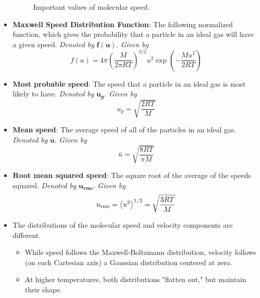 \documentclass[../notes.tex]{subfiles}
\begin{document}
\begin{itemize}
\begin{figure}[h!]
        \caption{Important values of molecular speed.}
        \label{fig:molecularSpeed}
    \end{figure}
    \item \textbf{Maxwell Speed Distribution Function}: The following normalized function, which gives the probability that a particle in an ideal gas will have a given speed. \emph{Denoted by} $\bm{f(u)}$. \emph{Given by}
    \begin{equation*}
        f(u) = 4\pi\left( \frac{M}{2\pi RT} \right)^{3/2}u^2\exp\left( -\frac{Mu^2}{2RT} \right)
    \end{equation*}
    \item \textbf{Most probable speed}: The speed that a particle in an ideal gas is most likely to have. \emph{Denoted by} $\bm{u_p}$. \emph{Given by}
    \begin{equation*}
        u_p = \sqrt{\frac{2RT}{M}}
    \end{equation*}
    \item \textbf{Mean speed}: The average speed of all of the particles in an ideal gas. \emph{Denoted by} $\bm{\bar{u}}$. \emph{Given by}
    \begin{equation*}
        \bar{u} = \sqrt{\frac{8RT}{\pi M}}
    \end{equation*}
    \item \textbf{Root mean squared speed}: The square root of the average of the speeds squared. \emph{Denoted by} $\bm{u_\text{rms}}$. \emph{Given by}
    \begin{equation*}
        u_\text{rms} = \left\langle{u^2}\right\rangle^{1/2}
        = \sqrt{\frac{3RT}{M}}
    \end{equation*}
    \item The distributions of the molecular speed and velocity components are different.
    \begin{itemize}
        \item While speed follows the Maxwell-Boltzmann distribution, velocity follows (on each Cartesian axis) a Gaussian distribution centered at zero.
        \item At higher temperatures, both distributions "flatten out," but maintain their shape.
    \end{itemize}

\end{itemize}
\end{document}
